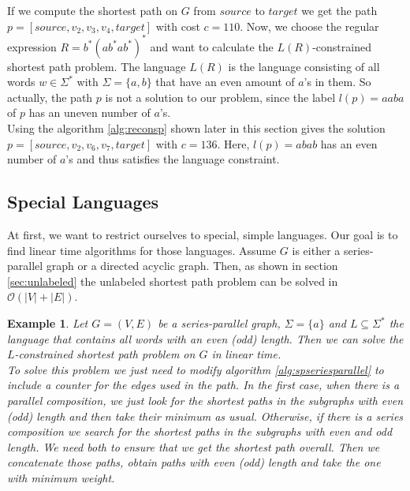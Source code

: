 \documentclass[]{article}
\newtheorem{example}[theorem]{Example}
\numberwithin{equation}{section}
\begin{document}
If we compute the shortest path on $G$ from $source$ to $target$ we get the path $p = [source, v_2, v_3, v_4, target]$ with cost $c=110$. Now, we choose the regular expression $R=b^*(ab^*ab^*)^*$ and want to calculate the $L(R)$-constrained shortest path problem. The language $L(R)$ is the language consisting of all words $w\in\Sigma^*$ with $\Sigma=\{a,b\}$ that have an even amount of $a$'s in them. So actually, the path $p$ is not a solution to our problem, since the label $l(p)=aaba$ of $p$ has an uneven number of $a$'s.\\

Using the algorithm \ref{alg:reconsp} shown later in this section gives the solution $p=[source, v_2, v_6, v_7, target]$ with $c=136$. Here, $l(p) = abab$ has an even number of $a$'s and thus satisfies the language constraint.

\subsection{Special Languages}
\label{sec:shp:special}

At first, we want to restrict ourselves to special, simple languages. Our goal is to find linear time algorithms for those languages. Assume $G$ is either a series-parallel graph or a directed acyclic graph. Then, as shown in section \ref{sec:unlabeled} the unlabeled shortest path problem can be solved in $\mathcal{O}(|V|+|E|)$.\\

\begin{example}
	Let $G=(V,E)$ be a series-parallel graph, $\Sigma = \{a\}$ and $L \subseteq \Sigma^*$ the language that contains all words with an even (odd) length. Then we can solve the $L$-constrained shortest path problem on $G$ in linear time.\\
	
	To solve this problem we just need to modify algorithm \ref{alg:spseriesparallel} to include a counter for the edges used in the path. In the first case, when there is a parallel composition, we just look for the shortest paths in the subgraphs with even (odd) length and then take their minimum as usual. Otherwise, if there is a series composition we search for the shortest paths in the subgraphs with even and odd length. We need both to ensure that we get the shortest path overall. Then we concatenate those paths, obtain paths with even (odd) length and take the one with minimum weight.
\end{example}
\end{document}
